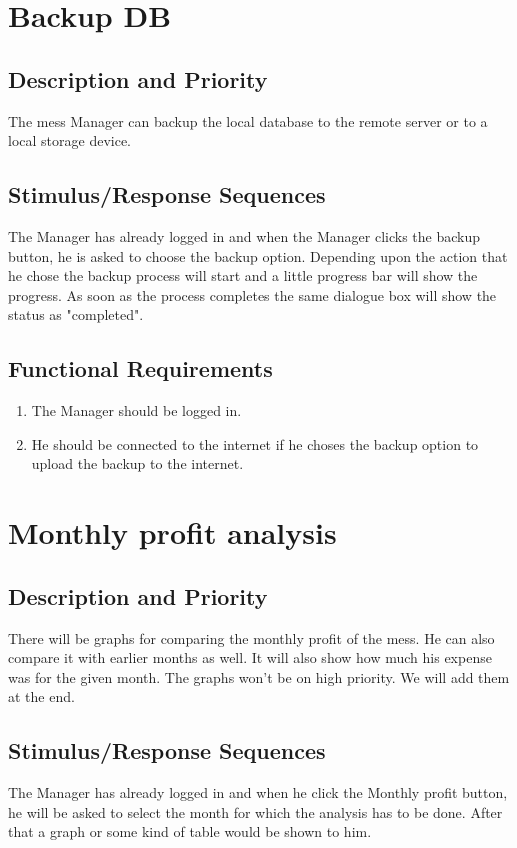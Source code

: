 \documentclass{scrreprt}
\begin{document}
\section{Backup DB}

\subsection{Description and Priority}
The mess Manager can backup the local database to the remote server or to a local storage device.

\subsection{Stimulus/Response Sequences}
The Manager has already logged in and when the Manager clicks the backup button, he is asked to choose the backup option. Depending upon the action that he chose the backup process will start and a little progress bar will show the progress. As soon as the process completes the same dialogue box will show the status as "completed".

\subsection{Functional Requirements}
\begin{enumerate}
\item The Manager should be logged in. 
\item He should be connected to the internet if he choses the backup option to upload the backup to the internet.
\end{enumerate}

\section{Monthly profit analysis}

\subsection{Description and Priority}
There will be graphs for comparing the monthly profit of the mess. He can also compare it with earlier months as well. It will also show how much his expense was for the given month. The graphs won't be on high priority. We will add them at the end.

\subsection{Stimulus/Response Sequences}
The Manager has already logged in and when he click the Monthly profit button, he will be asked to select the month for which the analysis has to be done. After that a graph or some kind of table would be shown to him.
\end{document}
